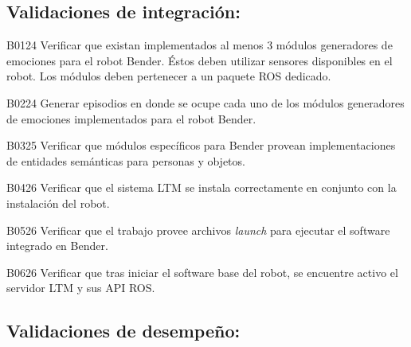 \subsection{Validaciones de integración: }

\begin{def-validacion}{B}{01}{24}
	Verificar que existan implementados al menos 3 módulos generadores de emociones para el robot Bender. Éstos deben utilizar sensores disponibles en el robot. Los módulos deben pertenecer a un paquete ROS dedicado.	
\end{def-validacion}

\begin{def-validacion}{B}{02}{24}
	Generar episodios en donde se ocupe cada uno de los módulos generadores de emociones implementados para el robot Bender.
\end{def-validacion}

\begin{def-validacion}{B}{03}{25}
Verificar que módulos específicos para Bender provean implementaciones de entidades semánticas para personas y objetos.
\end{def-validacion}

\begin{def-validacion}{B}{04}{26}
Verificar que el sistema LTM se instala correctamente en conjunto con la instalación del robot.	
\end{def-validacion}

\begin{def-validacion}{B}{05}{26}
Verificar que el trabajo provee archivos \textit{launch} para ejecutar el software integrado en Bender.
\end{def-validacion}

\begin{def-validacion}{B}{06}{26}
Verificar que tras iniciar el software base del robot, se encuentre activo el servidor LTM y sus API ROS.
\end{def-validacion}


\subsection{Validaciones de desempeño: }

